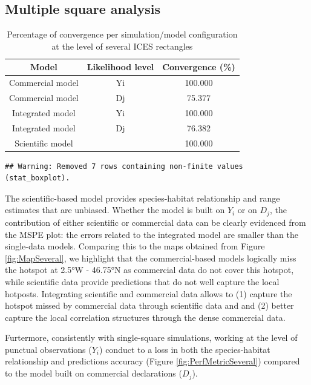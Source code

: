 \documentclass[
  english,
  man]{apa6}
\begin{document}
\hypertarget{multiple-square-analysis}{%
\subsection{Multiple square analysis}\label{multiple-square-analysis}}

\begin{table}

\caption{\label{tab:unnamed-chunk-4}Percentage of convergence per simulation/model configuration at the level of several ICES rectangles}
\centering
\begin{tabular}[t]{ccc}
\toprule
Model & Likelihood level & Convergence (\%)\\
\midrule
Commercial model & Yi & 100.000\\
Commercial model & Dj & 75.377\\
Integrated model & Yi & 100.000\\
Integrated model & Dj & 76.382\\
Scientific model &  & 100.000\\
\bottomrule
\end{tabular}
\end{table}

\begin{verbatim}
## Warning: Removed 7 rows containing non-finite values (stat_boxplot).
\end{verbatim}

The scientific-based model provides species-habitat relationship and range estimates that are unbiased. Whether the model is built on \(Y_i\) or on \(D_j\), the contribution of either scientific or commercial data can be clearly evidenced from the MSPE plot: the errors related to the integrated model are smaller than the single-data models. Comparing this to the maps obtained from Figure \ref{fig:MapSeveral}, we highlight that the commercial-based models logically miss the hotspot at 2.5°W - 46.75°N as commercial data do not cover this hotspot, while scientific data provide predictions that do not well capture the local hotposts. Integrating scientific and commercial data allows to (1) capture the hotspot missed by commercial data through scientific data and and (2) better capture the local correlation structures through the dense commercial data.

Furtermore, consistently with single-square simulations, working at the level of punctual observations (\(Y_i\)) conduct to a loss in both the species-habitat relationship and predictions accuracy (Figure \ref{fig:PerfMetricSeveral}) compared to the model built on commercial declarations (\(D_j\)).
\end{document}
